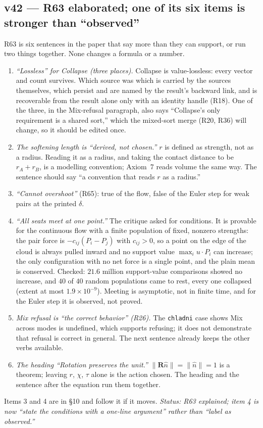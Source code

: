 \documentclass[11pt]{article}
\begin{document}
\subsection*{v42 --- R63 elaborated; one of its six items is stronger than ``observed''}
R63 is six sentences in the paper that say more than they can support, or run two things together. None changes a formula or a number.
\begin{enumerate}
\item \emph{``Lossless'' for Collapse (three places).} Collapse is value-lossless: every vector and count survives. Which source was which is carried by the sources
themselves, which persist and are named by the result's backward link, and is recoverable from the result alone only with an identity handle (R18). One of the three,
in the Mix-refusal paragraph, also says ``Collapse's only requirement is a shared sort,'' which the mixed-sort merge (R20, R36) will change, so it should be edited once.
\item \emph{The softening length is ``derived, not chosen.''} $r$ is defined as strength, not as a radius. Reading it as a radius, and taking the contact distance to be
$r_A+r_B$, is a modelling convention; Axiom~7 reads volume the same way. The sentence should say ``a convention that reads $r$ as a radius.''
\item \emph{``Cannot overshoot''} (R65): true of the flow, false of the Euler step for weak pairs at the printed $\delta$.
\item \emph{``All seats meet at one point.''} The critique asked for conditions. It is provable for the continuous flow with a finite population of fixed, nonzero strengths: the pair
force is $-c_{ij}(P_i-P_j)$ with $c_{ij}>0$, so a point on the edge of the cloud is always pulled inward and no support value $\max_i u\!\cdot\!P_i$ can increase; the only configuration with
no net force is a single point, and the plain mean is conserved. Checked: $21.6$ million support-value comparisons showed no increase, and $40$ of $40$ random populations came to rest, every one collapsed
(extent at most $1.9\times10^{-9}$). Meeting is asymptotic, not in finite time, and for the Euler step it is observed, not proved.
\item \emph{Mix refusal is ``the correct behavior'' (R26).} The \texttt{chladni} case shows Mix across modes is undefined, which supports refusing; it does not demonstrate that
refusal is correct in general. The next sentence already keeps the other verbs available.
\item \emph{The heading ``Rotation preserves the unit.''} $\lVert\mathbf R\hat n\rVert=\lVert\hat n\rVert=1$ is a theorem; leaving $r$, $\chi$, $\tau$ alone is the action chosen. The heading
and the sentence after the equation run them together.
\end{enumerate}
Items 3 and 4 are in \S10 and follow it if it moves. \emph{Status: R63 explained; item 4 is now ``state the conditions with a one-line argument'' rather than ``label as observed.''}
\end{document}
